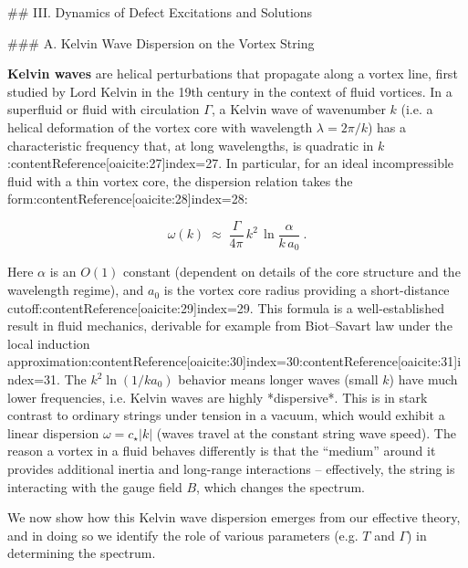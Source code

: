 \documentclass[12pt]{article}
\begin{document}
## III. Dynamics of Defect Excitations and Solutions

### A. Kelvin Wave Dispersion on the Vortex String 

\textbf{Kelvin waves} are helical perturbations that propagate along a vortex line, first studied by Lord Kelvin in the 19th century in the context of fluid vortices. In a superfluid or fluid with circulation $\Gamma$, a Kelvin wave of wavenumber $k$ (i.e. a helical deformation of the vortex core with wavelength $\lambda = 2\pi/k$) has a characteristic frequency that, at long wavelengths, is quadratic in $k$:contentReference[oaicite:27]{index=27}. In particular, for an ideal incompressible fluid with a thin vortex core, the dispersion relation takes the form:contentReference[oaicite:28]{index=28}:

\[ \omega(k) \;\approx\; \frac{\Gamma}{4\pi} \, k^2 \,\ln\!\frac{\alpha}{k\,a_0}~. \tag{8}\] 

Here $\alpha$ is an $O(1)$ constant (dependent on details of the core structure and the wavelength regime), and $a_0$ is the vortex core radius providing a short-distance cutoff:contentReference[oaicite:29]{index=29}. This formula is a well-established result in fluid mechanics, derivable for example from Biot–Savart law under the local induction approximation:contentReference[oaicite:30]{index=30}:contentReference[oaicite:31]{index=31}. The $k^2 \ln(1/k a_0)$ behavior means longer waves (small $k$) have much lower frequencies, i.e. Kelvin waves are highly *dispersive*. This is in stark contrast to ordinary strings under tension in a vacuum, which would exhibit a linear dispersion $\omega = c_\star |k|$ (waves travel at the constant string wave speed). The reason a vortex in a fluid behaves differently is that the “medium” around it provides additional inertia and long-range interactions – effectively, the string is interacting with the gauge field $B$, which changes the spectrum.

We now show how this Kelvin wave dispersion emerges from our effective theory, and in doing so we identify the role of various parameters (e.g. $T$ and $\Gamma$) in determining the spectrum. 
\end{document}
